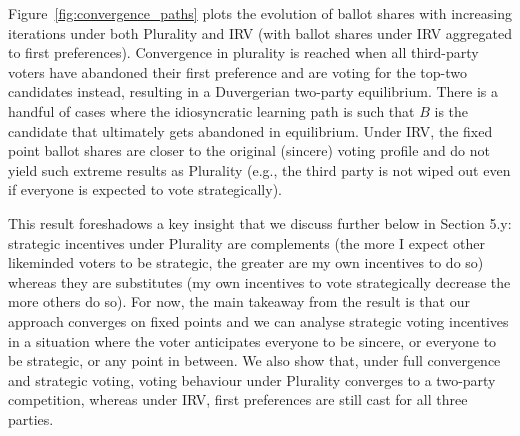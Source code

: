 \documentclass[12pt, letter]{article}
\begin{document}
 Figure~\ref{fig:convergence_paths} plots the evolution of ballot shares with increasing iterations under both Plurality and IRV (with ballot shares under IRV aggregated to first preferences). Convergence in plurality is reached when all third-party voters have abandoned their first preference and are voting for the top-two candidates instead, resulting in a Duvergerian two-party equilibrium. There is a handful of cases where the idiosyncratic learning path is such that $B$ is the candidate that ultimately gets abandoned in equilibrium. Under IRV, the fixed point ballot shares are closer to the original (sincere) voting profile and do not yield such extreme results as Plurality (e.g., the third party is not wiped out even if everyone is expected to vote strategically).

 This result foreshadows a key insight that we discuss further below in Section 5.y: strategic incentives under Plurality are complements (the more I expect other likeminded voters to be strategic, the greater are my own incentives to do so) whereas they are substitutes (my own incentives to vote strategically decrease the more others do so). For now, the main takeaway from the result is that our approach converges on fixed points and we can analyse strategic voting incentives in a situation where the voter anticipates everyone to be sincere, or everyone to be strategic, or any point in between. We also show that, under full convergence and strategic voting, voting behaviour under Plurality converges to a two-party competition, whereas under IRV, first preferences are still cast for all three parties.

\end{document}
